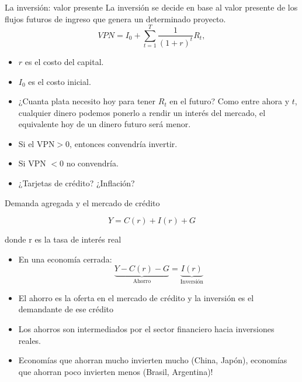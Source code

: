 \documentclass{beamer}
\begin{document}
\begin{frame}{La inversión: valor presente}
    La inversión se decide en base al valor presente de los flujos futuros de ingreso que genera un determinado proyecto.
    \begin{equation}
        VPN = I_0 + \sum_{t=1} ^{T} \frac{1}{(1+r)^t} R_t,
    \end{equation}
    \begin{itemize}
        \item $r$ es el costo del capital.
        \item $I_0$ es el costo inicial.
        \item ¿Cuanta plata necesito hoy para tener $R_t$ en el futuro? Como entre ahora y $t$, cualquier dinero podemos ponerlo a rendir un interés del mercado, el equivalente hoy de un dinero futuro será menor.
        \item Si el VPN$>0$, entonces convendría invertir.
        \item Si VPN $<0$ no convendría.
        \item ¿Tarjetas de crédito? ¿Inflación?
    \end{itemize}
\end{frame}




\begin{frame}{Demanda agregada y el mercado de crédito}

$$ Y = C(r) + I(r) + G $$

\centering \small{donde r es la tasa de interés real}

\begin{itemize}
\item En una economía cerrada:
\[
\underbrace{Y - C(r) - G}_{\text{Ahorro}} = \underbrace{I(r)}_{\text{Inversión}} 
\]
\end{itemize}
\begin{itemize}
\item El ahorro es la oferta en el mercado de crédito y la inversión es el demandante de ese crédito
\item Los ahorros son intermediados por el sector financiero hacia inversiones reales.
\item Economías que ahorran mucho invierten mucho (China, Japón), economías que ahorran poco invierten menos (Brasil, Argentina)! 
\end{itemize}
\end{frame}
\end{document}
